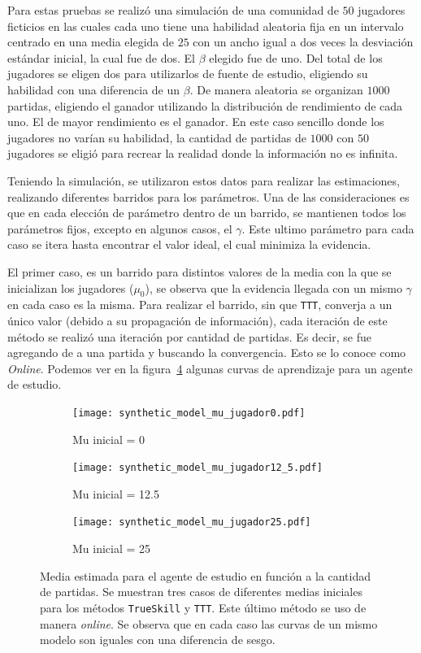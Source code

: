 \documentclass[11pt,twoside,spanish]{report} %
\begin{document}
Para estas pruebas se realiz\'o una simulaci\'on de una comunidad de $50$ jugadores ficticios en las cuales cada uno tiene una habilidad aleatoria fija en un intervalo centrado en una media elegida de $25$ con un ancho igual a dos veces la desviaci\'on est\'andar inicial, la cual fue de dos.
El $\beta$ elegido fue de uno.
Del total de los jugadores se eligen dos para utilizarlos de fuente de estudio, eligiendo su habilidad con una diferencia de un $\beta$.
De manera aleatoria se organizan $1000$ partidas, eligiendo el ganador utilizando la distribuci\'on de rendimiento de cada uno.
El de mayor rendimiento es el ganador.
En este caso sencillo donde los jugadores no var\'ian su habilidad, la cantidad de partidas de $1000$ con $50$ jugadores se eligi\'o para recrear la realidad donde la informaci\'on no es infinita.

Teniendo la simulaci\'on, se utilizaron estos datos para realizar las estimaciones, realizando diferentes barridos para los par\'ametros.
Una de las consideraciones es que en cada elecci\'on de par\'ametro dentro de un barrido, se mantienen todos los par\'ametros fijos,  excepto en algunos casos, el $\gamma$.
Este ultimo par\'ametro para cada caso se itera hasta encontrar el valor ideal, el cual minimiza la evidencia.

El primer caso, es  un barrido para distintos valores de la media con la que se inicializan los jugadores ($\mu_0$), se observa que la evidencia llegada con un mismo $\gamma$ en cada caso es la misma. Para realizar el barrido, sin que \texttt{TTT}, converja a un \'unico valor (debido a su propagaci\'on de informaci\'on), cada iteraci\'on de este m\'etodo se realiz\'o una iteraci\'on por cantidad de partidas.
Es decir, se fue agregando de a una partida y buscando la convergencia.
Esto se lo conoce como \textit{Online}.
Podemos ver en la figura~\ref{fig:Mu_lc} algunas curvas de aprendizaje para un agente de estudio.

\begin{figure}[H]
  \begin{subfigure}{0.33\textwidth}
    \texttt{[image: synthetic\_model\_mu\_jugador0.pdf]}
    \caption{Mu inicial = 0}
    \label{fig:Mu_jugador0}
  \end{subfigure}%
  \hfill
  \begin{subfigure}{0.33\textwidth}
    \texttt{[image: synthetic\_model\_mu\_jugador12\_5.pdf]}
    \caption{Mu inicial = 12.5}
    \label{fig:Mu_jugador12_5}
  \end{subfigure}%
  \hfill
  \begin{subfigure}{0.33\textwidth}
    \texttt{[image: synthetic\_model\_mu\_jugador25.pdf]}
    \caption{Mu inicial = 25}
    \label{fig:Mu_jugador25}
  \end{subfigure}

  \caption{Media estimada para el agente de estudio en funci\'on a la cantidad de partidas.	Se muestran tres casos de diferentes medias iniciales para los m\'etodos \texttt{TrueSkill} y \texttt{TTT}. Este \'ultimo m\'etodo se uso de manera \textit{online}. Se observa que en cada caso las curvas de un mismo modelo son iguales con una diferencia de sesgo.}
  \label{fig:Mu_lc}
\end{figure}
\end{document}
